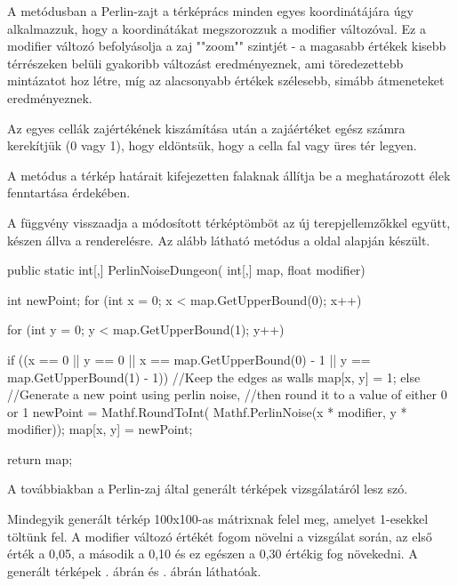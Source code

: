 A metódusban a Perlin-zajt a térképrács minden egyes koordinátájára úgy alkalmazzuk, hogy a koordinátákat megszorozzuk a modifier változóval. Ez a modifier változó befolyásolja a zaj ""zoom"" szintjét - a magasabb értékek kisebb térrészeken belüli gyakoribb változást eredményeznek, ami töredezettebb mintázatot hoz létre, míg az alacsonyabb értékek szélesebb, simább átmeneteket eredményeznek.

Az egyes cellák zajértékének kiszámítása után a zajáértéket egész számra kerekítjük (0 vagy 1), hogy eldöntsük, hogy a cella fal vagy üres tér legyen.

A metódus a térkép határait kifejezetten falaknak állítja be a meghatározott élek fenntartása érdekében.

A függvény visszaadja a módosított térképtömböt az új terepjellemzőkkel együtt, készen állva a renderelésre. Az alább látható metódus a \cite{mapgenerator} oldal alapján készült.

\begin{java}
public static int[,] PerlinNoiseDungeon(
    int[,] map, float modifier)
{
    int newPoint;
    for (int x = 0; x < 
        map.GetUpperBound(0); x++)
    {
        for (int y = 0; y < 
            map.GetUpperBound(1); y++)
        {

            if ((x == 0 || y == 0 || 
                x == map.GetUpperBound(0) - 1 || 
                y == map.GetUpperBound(1) - 1))
            {
                //Keep the edges as walls
                map[x, y] = 1;
            }
            else
            {
                //Generate a new point using perlin noise,
                //then round it to a value of either 0 or 1
                newPoint = Mathf.RoundToInt(
                    Mathf.PerlinNoise(x * modifier, 
                    y * modifier));
                map[x, y] = newPoint;
            }
        }
    }
    return map;
}
\end{java}

A továbbiakban a Perlin-zaj által generált térképek vizsgálatáról lesz szó.

Mindegyik generált térkép 100x100-as mátrixnak felel meg, amelyet 1-esekkel töltünk fel. A modifier változó értékét fogom növelni a vizsgálat során, az első érték a 0,05, a második a 0,10 és ez egészen a 0,30 értékig fog növekedni. A generált térképek . ábrán és . ábrán láthatóak.

